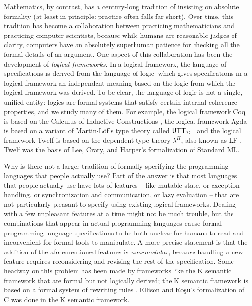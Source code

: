 Mathematics, by contrast, has a century-long tradition of insisting on
absolute formality (at least in principle: practice often falls far
short).
%
Over time, this tradition
has become a collaboration between practicing mathematicians and
practicing computer scientists, because while humans are reasonable
judges of clarity, computers have an absolutely superhuman patience
for checking all the formal details of an argument.  One aspect of
this collaboration has been the development of {\it logical
  frameworks}. In a logical framework, the language of specifications
is derived from the language of logic, which gives specifications in a
logical framework an independent meaning based on the logic from which
the logical framework was derived. To be clear, the language of logic
is not a single, unified entity: logics are formal systems that
satisfy certain internal coherence properties, and we study many of
them. For example, the logical framework Coq is based on the Calculus
of Inductive Constructions \cite{coq10coq}, the logical framework Agda
is based on a variant of Martin-L\"of's type theory called ${\sf
  UTT}_\Sigma$ \cite{norell08towards}, and the logical framework
Twelf is based
on the dependent type theory $\lambda^\Pi$, also known as LF
\cite{pfenning99system}. Twelf was the basis of Lee, Crary, and
Harper's formalization of Standard ML.  %

Why is there not a larger tradition of formally specifying the
programming languages that people actually use? Part of the answer is
that most languages that people actually use have lots of features --
like mutable state, or exception handling, or synchronization and
communication, or lazy evaluation -- that are not particularly
pleasant to specify using existing logical frameworks. Dealing with a
few unpleasant features at a time might not be much trouble, but the
combinations that appear in actual programming languages cause formal
programming language specifications to be both unclear for humans to
read and inconvenient for formal tools to manipulate. A more precise
statement is that the addition of the aforementioned features is {\it
  non-modular}, because handling a new feature requires reconsidering
and revising the rest of the specification.  Some headway on this
problem has been made by frameworks like the K semantic framework that
are formal but not logically derived; the K semantic framework is
based on a formal system 
of rewriting rules \cite{rosu10overview}. Ellison
and Ro\c{s}u's formalization of C was done in the K semantic
framework.

